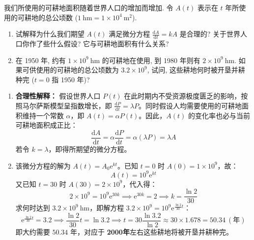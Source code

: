 \documentclass[lang=cn,11pt]{elegantbook}
\begin{document}
\begin{exercise}[实际应用题]
我们所使用的可耕地面积随着世界人口的增加而增加. 令 $A(t)$ 表示在 $t$ 年所使用的可耕地的总公顷数 ($1\ \mathrm{hm}=1\times10^4\ \mathrm{m}^2$).
\begin{enumerate}
    \item[(1)] 试解释为什么我们期望 $A(t)$ 满足微分方程 $\displaystyle \frac{\mathrm{d}A}{\mathrm{d}t}=kA$ 是合理的? 关于世界人口你作了些什么假设? 它与可耕地面积有什么关系?
    \item[(2)] 在 1950 年, 约有 $1\times10^9\ \mathrm{hm}$ 的可耕地在使用, 到 1980 年则有 $2\times10^9\ \mathrm{hm}$. 如果可供使用的可耕地的总公顷数为 $3.2\times10^9$, 试问, 这些耕地何时被开垦并耕种完 ($t=0$ 指 1950 年)?
\end{enumerate}
\end{exercise}
\begin{solution}
\begin{enumerate}
    \item[(1)] \textbf{合理性解释：} 假设世界人口 $P(t)$ 在此时期内不受资源极度匮乏的影响，按照马尔萨斯模型呈指数增长，即 $\frac{\mathrm{d}P}{\mathrm{d}t} = \lambda P$。同时假设人均需要使用的可耕地面积维持一个常数 $\alpha$，即 $A(t) = \alpha P(t)$。因此，$A(t)$ 的变化率也必与当前可耕地面积成正比：
    \[
    \frac{\mathrm{d}A}{\mathrm{d}t} = \alpha \frac{\mathrm{d}P}{\mathrm{d}t} = \alpha (\lambda P) = \lambda A
    \]
    若令 $k=\lambda$，即得所期望的微分方程。
    
    \item[(2)] 该微分方程的解为 $A(t) = A_0\mathrm{e}^{kt}$。已知 $t=0$ 时 $A(0) = 1\times 10^9$，故：
    \[
    A(t) = 10^9\mathrm{e}^{kt}
    \]
    又已知 $t=30$ 时 $A(30) = 2\times 10^9$，代入得：
    \[
    2\times 10^9 = 10^9\mathrm{e}^{30k} \implies \mathrm{e}^{30k} = 2 \implies k = \frac{\ln 2}{30}
    \]
    求何时达到 $3.2\times 10^9\ \mathrm{hm}$，即解方程 $3.2\times 10^9 = 10^9\mathrm{e}^{\frac{\ln 2}{30}t}$：
    \[
    \mathrm{e}^{\frac{\ln 2}{30}t} = 3.2 \implies \frac{\ln 2}{30}t = \ln 3.2 \implies t = 30 \frac{\ln 3.2}{\ln 2} \approx 30 \times 1.678 = 50.34\ (\text{年})
    \]
    即大约需要 $50.34$ 年，对应于 \textbf{2000年}左右这些耕地将被开垦并耕种完。
\end{enumerate}
\end{solution}
\end{document}
